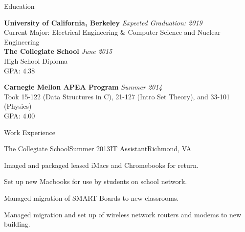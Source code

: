 \documentclass{resume} %
\begin{document}

\begin{rSection}{Education}

{\bf University of California, Berkeley} \hfill {\em Expected Graduation: 2019} \\ 
Current Major: Electrical Engineering \& Computer Science  and Nuclear Engineering\\
 

{\bf The Collegiate School} \hfill {\em June 2015} \\ 
High School Diploma\\
GPA: 4.38

{\bf Carnegie Mellon APEA Program} \hfill {\em Summer 2014} \\ 
Took 15-122 (Data Structures in C), 21-127 (Intro Set Theory), and 33-101 (Physics) \\
GPA: 4.00

\end{rSection}


\begin{rSection}{Work Experience}

\begin{rSubsection}{The Collegiate School}{Summer 2013}{IT Assistant}{Richmond, VA}
\item Imaged and packaged leased iMacs and Chromebooks for return.
\item Set up new Macbooks for use by students on school network.
\item Managed migration of SMART Boards to new classrooms.
\item Managed migration and set up of wireless network routers and modems to new
building.
\end{rSubsection}
\end{rSection}

\end{document}
